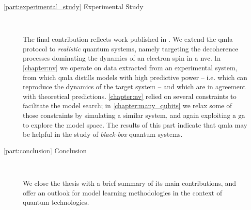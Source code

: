 \begin{description}
    \item[\cref{part:experimental_study} Experimental Study] \

        The final contribution reflects work published in \cite{gentile2020learning}.
        We extend the \gls{qmla} protocol to \emph{realistic} quantum systems, namely targeting the decoherence processes dominating the 
        dynamics of an electron spin in a \acrlong{nvc}. 
        In \cref{chapter:nv} we operate on data extracted from an experimental system, 
            from which \gls{qmla} distills models with high predictive power -- i.e. which can reproduce the dynamics of the target system -- 
            and which are in agreement with theoretical predictions. 
        \cref{chapter:nv} relied on several constraints to facilitate the model search; 
            in \cref{chapter:many_qubits} we relax some of those constraints by simulating a similar system, 
            and again exploiting a \acrlong{ga} to explore the model space. 
        The results of this part indicate that \gls{qmla} may be helpful in the study of \emph{black-box} quantum systems.
    
    \item[\cref{part:conclusion} Conclusion] \
    
        We close the thesis with a brief summary of its main contributions, 
            and offer an outlook for model learning methodologies in the context of quantum technologies. 

\end{description}

